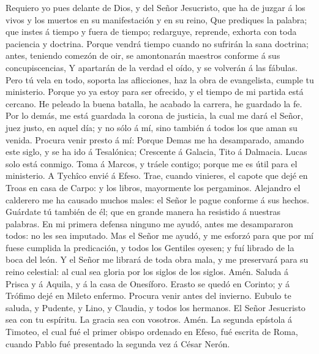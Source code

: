  Requiero yo pues delante de Dios, y del Señor Jesucristo,
que ha de juzgar á los vivos y los muertos en su manifestación y en su
reino,  Que prediques la palabra; que instes á tiempo y
fuera de tiempo; redarguye, reprende, exhorta con toda paciencia y
doctrina.  Porque vendrá tiempo cuando no sufrirán la sana
doctrina; antes, teniendo comezón de oir, se amontonarán maestros
conforme á sus concupiscencias,  Y apartarán de la verdad
el oído, y se volverán á las fábulas.  Pero tú vela en
todo, soporta las aflicciones, haz la obra de evangelista, cumple tu
ministerio.  Porque yo ya estoy para ser ofrecido, y el
tiempo de mi partida está cercano.  He peleado la buena
batalla, he acabado la carrera, he guardado la fe.  Por lo
demás, me está guardada la corona de justicia, la cual me dará el Señor,
juez justo, en aquel día; y no sólo á mí, sino también á todos los que
aman su venida.  Procura venir presto á mí:
 Porque Demas me ha desamparado, amando este siglo, y se
ha ido á Tesalónica; Crescente á Galacia, Tito á Dalmacia.
 Lucas solo está conmigo. Toma á Marcos, y tráele
contigo; porque me es útil para el ministerio.  A Tychîco
envié á Efeso.  Trae, cuando vinieres, el capote que dejé
en Troas en casa de Carpo: y los libros, mayormente los pergaminos.
 Alejandro el calderero me ha causado muchos males: el
Señor le pague conforme á sus hechos.  Guárdate tú
también de él; que en grande manera ha resistido á nuestras palabras.
 En mi primera defensa ninguno me ayudó, antes me
desampararon todos: no les sea imputado.  Mas el Señor me
ayudó, y me esforzó para que por mí fuese cumplida la predicación, y
todos los Gentiles oyesen; y fuí librado de la boca del león.
 Y el Señor me librará de toda obra mala, y me preservará
para su reino celestial: al cual sea gloria por los siglos de los
siglos. Amén.  Saluda á Prisca y á Aquila, y á la casa de
Onesíforo.  Erasto se quedó en Corinto; y á Trófimo dejé
en Mileto enfermo.  Procura venir antes del invierno.
Eubulo te saluda, y Pudente, y Lino, y Claudia, y todos los hermanos.
 El Señor Jesucristo sea con tu espíritu. La gracia sea
con vosotros. Amén. La segunda epístola á Timoteo, el cual fué el primer
obispo ordenado en Efeso, fué escrita de Roma, cuando Pablo fué
presentado la segunda vez á César Nerón.

